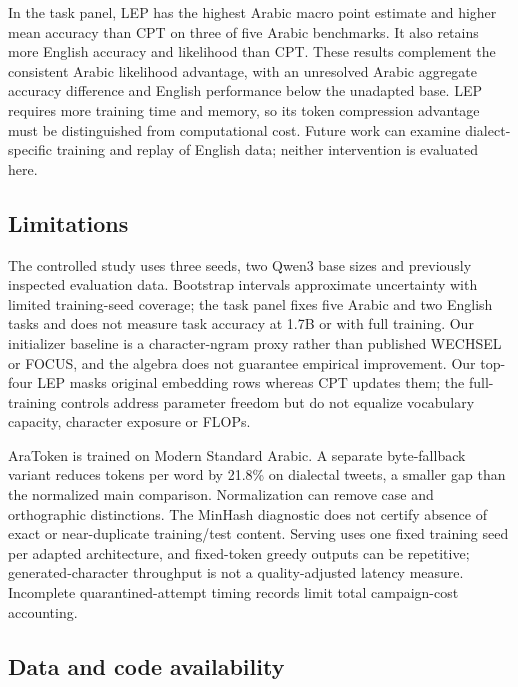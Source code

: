 \documentclass{ieeeaccess}
\begin{document}
In the task panel, LEP has the highest Arabic macro point estimate and
higher mean accuracy than CPT on three of five Arabic benchmarks. It also
retains more English accuracy and likelihood than CPT. These results
complement the consistent Arabic likelihood advantage, with an unresolved
Arabic aggregate accuracy difference and English performance below the
unadapted base. LEP requires more training time and memory, so its token
compression advantage must be distinguished from computational cost.
Future work can examine dialect-specific training and replay of English
data; neither intervention is evaluated here.

\subsection*{Limitations}

The controlled study uses three seeds, two Qwen3 base sizes and previously
inspected evaluation data. Bootstrap intervals approximate uncertainty
with limited training-seed coverage; the task panel fixes five Arabic and
two English tasks and does not measure task accuracy at 1.7B or with full
training. Our initializer baseline is a character-ngram proxy rather than
published WECHSEL or FOCUS, and the algebra does not guarantee empirical
improvement. Our top-four LEP masks original embedding rows whereas CPT
updates them; the full-training controls address parameter freedom but
do not equalize vocabulary capacity, character exposure or FLOPs.

AraToken is trained on Modern Standard Arabic. A separate byte-fallback
variant reduces tokens per word by 21.8\% on dialectal tweets, a smaller
gap than the normalized main comparison. Normalization can remove case
and orthographic distinctions. The MinHash diagnostic does not certify
absence of exact or near-duplicate training/test content. Serving uses
one fixed training seed per adapted architecture, and fixed-token greedy
outputs can be repetitive; generated-character throughput is not a
quality-adjusted latency measure. Incomplete quarantined-attempt timing
records limit total campaign-cost accounting.

\subsection*{Data and code availability}
\label{sec:availability}
\end{document}
